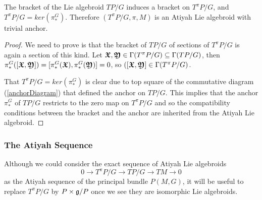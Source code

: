 \begin{theorem}
The bracket of the Lie algebroid $TP/G$ induces a bracket on $T^\pi P/G$, and $T^\pi P/G = ker(\pi_*^G)$. Therefore $(T^\pi P/G, \pi, M)$ is an Atiyah Lie algebroid with trivial anchor.
\end{theorem}

\begin{proof}
We need to prove is that the bracket of $TP/G$ of sections of $T^\pi P/G$ is again a section of this kind. Let $\bm{\mathfrak{X}}, \bm{\mathfrak{Y}} \in \Gamma(T^\pi P/G) \subseteq \Gamma(TP/G)$, then $\pi_*^G([\bm{\mathfrak{X}}, \bm{\mathfrak{Y}}]) = [\pi_*^G (\bm{\mathfrak{X}}), \pi_*^G(\bm{\mathfrak{Y}})] = 0$, so $([\bm{\mathfrak{X}}, \bm{\mathfrak{Y}}] \in \Gamma(T^\pi P/G)$. 

That $T^\pi P/G = ker(\pi_*^G)$ is clear due to top square of the commutative diagram (\ref{anchorDiagram}) that defined the anchor on $TP/G$. This implies that the anchor $\pi_*^G$ of $TP/G$ restricts to the zero map on $T^\pi P/G$ and so the compatibility conditions between the bracket and the anchor are inherited from the Atiyah Lie algebroid.
\end{proof}

\subsubsection{The Atiyah Sequence}%

Although we could consider the exact sequence of Atiyah Lie algebroids
\begin{equation*}
    0 \to T^\pi P/G \to TP/G \to TM \to 0
\end{equation*}
as the Atiyah sequence of the principal bundle $P(M, G)$, it will be useful to replace $T^\pi P/G$ by $P \times \mathfrak{g}/P$ once we see they are isomorphic Lie algebroids.


